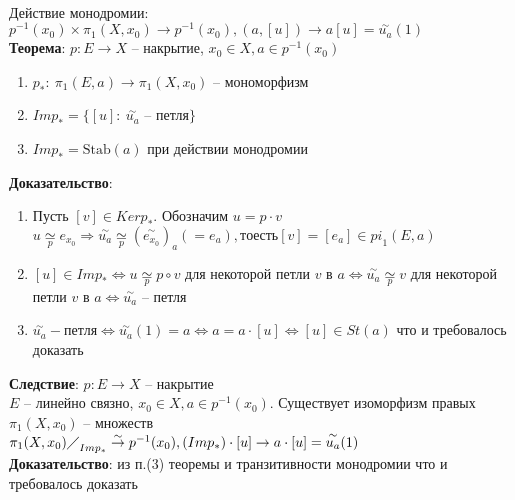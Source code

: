 	\begin{figure}[h]
	\end{figure}\\
	Действие монодромии: $p^{-1} (x_0) \times {\pi}_1 (X, x_0) \rightarrow p^{-1} (x_0), (a,[u])\rightarrow a[u] = \overset{\sim}{u_a} (1)$\\
	\textbf{Теорема}: $p: E\rightarrow X$ -- накрытие, $x_0 \in X, a\in p^{-1} (x_0)$
	\begin{enumerate}
		\item $p_{\ast}:\ {\pi}_1 (E,a) \rightarrow {\pi}_1 (X,x_0)$ -- мономорфизм
		\item $Im p_{\ast} = \{ [u]:\ \overset{\sim}{u_a}$ -- петля$\}$
		\item $Im p_{\ast} = \text{Stab}(a)$ при действии монодромии
		\begin{figure}[h]
		\end{figure}
	\end{enumerate}
	\textbf{Доказательство}:
	\begin{enumerate}
		\item Пусть $[v] \in Ker p_{\ast}$. Обозначим $u = p\cdot v$\\
		$u \underset{p}{\simeq} e_{x_0} \Rightarrow \overset{\sim}{u_a} \underset{p}{\simeq} {(\overset{\sim}{e_{x_0}})}_a ( = e_a), то есть [v] = [e_a] \in {pi}_1 (E,a)$
		\item $[u]\in Im p_{\ast} \Leftrightarrow u \underset{p}{\simeq} p \circ v$ для некоторой петли $v$ в $a \Leftrightarrow \overset{\sim}{u_a} \underset{p}{\simeq} v$ для некоторой петли $v$ в $a \Leftrightarrow \overset{\sim}{u_a}$ -- петля
		\item $\overset{\sim}{u_a} -петля \Leftrightarrow \overset{\sim}{u_a} (1) = a \Leftrightarrow a = a\cdot [u] \Leftrightarrow [u] \in St(a)$ что и требовалось доказать
	\end{enumerate}
	\textbf{Следствие}: $p: E\rightarrow X$ -- накрытие\\
	$E$ -- линейно связно, $x_0 \in X, a\in p^{-1} (x_0)$. Существует изоморфизм правых ${\pi}_1 (X,x_0)$ -- множеств\\
	${{\pi}_1 (X,x_0) \diagup}_{Im p_{\ast}} \overset{\sim}{\rightarrow} p^{-1} (x_0), (Im p_{\ast})\cdot [u] \rightarrow a\cdot [u] = \overset{\sim}{u_a} (1)$\\
	\textbf{Доказательство}: из п.(3) теоремы и транзитивности монодромии что и требовалось доказать


